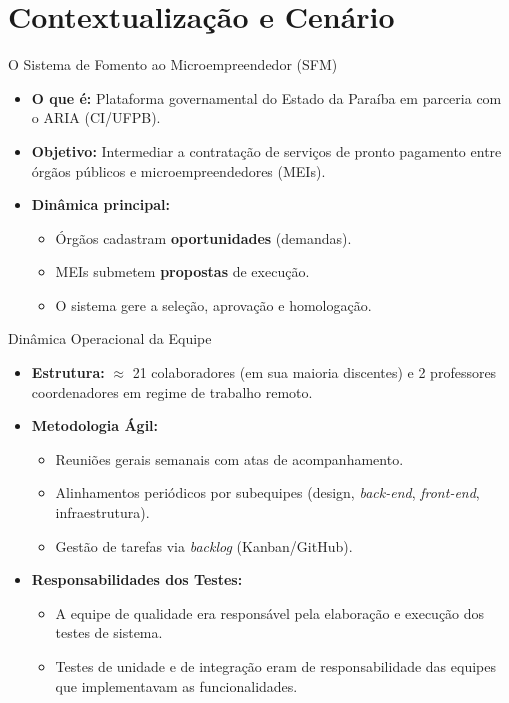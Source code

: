 \section{Contextualização e Cenário}

\begin{frame}{O Sistema de Fomento ao Microempreendedor (SFM)}
  \begin{itemize}
    \item \textbf{O que é:} Plataforma governamental do Estado da Paraíba em parceria com o ARIA (CI/UFPB).
    \item \textbf{Objetivo:} Intermediar a contratação de serviços de pronto pagamento entre órgãos públicos e microempreendedores (MEIs).
    \item \textbf{Dinâmica principal:} 
    \begin{itemize}
        \item Órgãos cadastram \textbf{oportunidades} (demandas).
        \item MEIs submetem \textbf{propostas} de execução.
        \item O sistema gere a seleção, aprovação e homologação.
    \end{itemize}
  \end{itemize}
\end{frame}

\begin{frame}{Dinâmica Operacional da Equipe}
  \begin{itemize}
    \item \textbf{Estrutura:} $\approx$ 21 colaboradores (em sua maioria discentes) e 2 professores coordenadores em regime de trabalho remoto.
    \item \textbf{Metodologia Ágil:}
    \begin{itemize}
        \item Reuniões gerais semanais com atas de acompanhamento.
        \item Alinhamentos periódicos por subequipes (design, \textit{back-end}, \textit{front-end}, infraestrutura).
        \item Gestão de tarefas via \textit{backlog} (Kanban/GitHub).
    \end{itemize}
    \item \textbf{Responsabilidades dos Testes:}
    \begin{itemize}
        \item A equipe de qualidade era responsável pela elaboração e execução dos testes de sistema.
        \item Testes de unidade e de integração eram de responsabilidade das equipes que implementavam as funcionalidades.
    \end{itemize}
  \end{itemize}
\end{frame}

